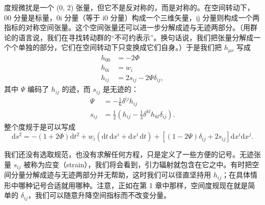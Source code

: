 度规微扰是一个 (0, 2) 张量，但它不是反对称的，而是对称的。在空间转动下，00 分量是标量，0i 分量（等于 i0 分量）构成一个三维矢量，ij 分量则构成一个两指标的对称空间张量。这个空间张量还可以进一步分解成迹与无迹两部分。（用群论的语言说，我们在寻找转动群的“不可约表示”。换句话说，我们把张量分解成一个个单独的部分，它们在空间转动下只变换成它们自身。）于是我们把 $h_{\mu\nu}$ 写成
\begin{align*}
h_{00} &= -2\Phi \\
h_{0i} &= w_{i} \\
h_{ij} &= 2s_{ij} - 2\Psi\delta_{ij},
\tag{7.16}
\end{align*}
其中 $\Psi$ 编码了 $h_{ij}$ 的迹，而 $s_{ij}$ 是无迹的：
\begin{align*}
\Psi &= -\frac{1}{6}\delta^{ij}h_{ij} \\
s_{ij} &= \frac{1}{2}\left(h_{ij} - \frac{1}{3}\delta^{kl}h_{kl}\delta_{ij}\right).
\tag{7.17}
\end{align*}
整个度规于是可以写成
\begin{equation*}
\boxed{\,\mathrm{d}s^{2} = -(1+2\Phi)\mathrm{d}t^{2} + w_{i}(\mathrm{d}t\,\mathrm{d}x^{i} + \mathrm{d}x^{i}\,\mathrm{d}t) + [(1-2\Psi)\delta_{ij} + 2s_{ij}]\mathrm{d}x^{i}\mathrm{d}x^{j}.\,}
\tag{7.18}
\end{equation*}

我们还没有选取规范，也没有求解任何方程，只是定义了一些方便的记号。无迹张量 $s_{ij}$ 被称为应变（strain），我们将会看到，引力辐射就包含在它之中。有时把空间分量分解成迹与无迹两部分并无帮助，这时我们可以径直坚持用 $h_{ij}$；在具体情形中哪种记号合适就用哪种。注意，正如在第 1 章中那样，空间度规现在就是简单的 $\delta_{ij}$，我们可以随意升降空间指标而不改变分量。

